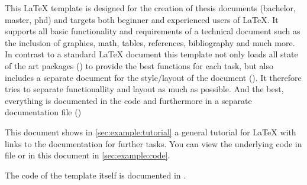 This \LaTeX{} template is designed for the creation of thesis documents (bachelor, master, phd) and targets both beginner and experienced users of \LaTeX{}. It supports all basic functionality and requirements of a technical document such as the inclusion of graphics, math, tables, references, bibliography and much more. In contrast to a standard LaTeX document this template not only loads all state of the art packages () to provide the best functions for each task, but also includes a separate document for the style/layout of the document (). It therefore tries to separate functionallity and layout as much as possible. And the best, everything is documented in the code and furthermore in a separate documentation file ()

This document shows in \cref{sec:example:tutorial} a general tutorial for \LaTeX{} with links to the documentation for further tasks. You can view the underlying code in file  or in this document in \cref{sec:example:code}.

The code of the template itself is documented in .